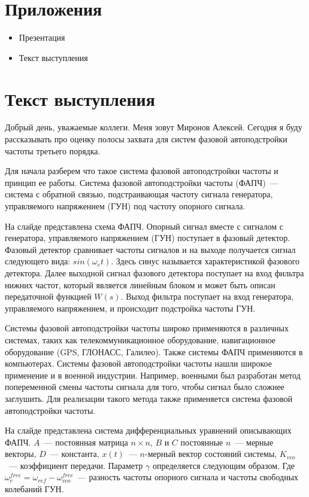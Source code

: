 \documentclass[a4paper,article,14pt]{extarticle}
\begin{document}
\pagebreak
\section*{Приложения}
\begin{itemize}
	\item Презентация
	\item Текст выступления
\end{itemize}

\pagebreak
\section*{Текст выступления}
  Добрый день, уважаемые коллеги. Меня зовут Миронов Алексей. Сегодня я буду рассказывать про оценку полосы захвата для систем фазовой автоподстройки частоты третьего порядка. 

  Для начала разберем что такое система фазовой автоподстройки частоты и принцип ее работы. Система фазовой автоподстройки частоты (ФАПЧ)~--- система с обратной связью, подстраивающая частоту сигнала генератора, управляемого напряжением (ГУН) под частоту опорного сигнала.
  
На слайде представлена схема ФАПЧ. Опорный сигнал вместе с сигналом с генератора, управляемого напряжением (ГУН) поступает в фазовый детектор. Фазовый детектор сравнивает частоты сигналов и на выходе получается сигнал следующего вида: $sin(\omega_e t)$. Здесь синус называется характеристикой фазового детектора. Далее выходной сигнал фазового детектора поступает на вход фильтра нижних частот, который является линейным блоком и может быть описан передаточной функцией $W(s)$. Выход фильтра поступает на вход генератора, управляемого напряжением, и происходит подстройка частоты ГУН. 
  
  Системы фазовой автоподстройки частоты широко применяются в различных системах, таких как телекоммуникационное оборудование, навигационное оборудование (GPS, ГЛОНАСС, Галилео). Также системы ФАПЧ применяются в компьютерах. Системы фазовой автоподстройки частоты нашли широкое применение и в военной индустрии. Например, военными был разработан метод попеременной смены частоты сигнала для того, чтобы сигнал было сложнее заглушить. Для реализации такого метода также применяется система фазовой автоподстройки частоты.
    
На слайде представлена система дифференциальных уравнений описывающих ФАПЧ. $A$~--- постоянная матрица $n \times n$, $B$ и $C$ постоянные $n$~--- мерные векторы, $D$~--- константа, $x(t)$~--- $n$-мерный вектор состояний системы, $K_{vco}$~--- коэффициент передачи. Параметр $\gamma$ определяется следующим образом. Где $\omega^{free}_{e}=\omega_{ref}-\omega_{vco}^{free}$~--- разность частоты опорного сигнала и частоты свободных колебаний ГУН.
    
\end{document}
